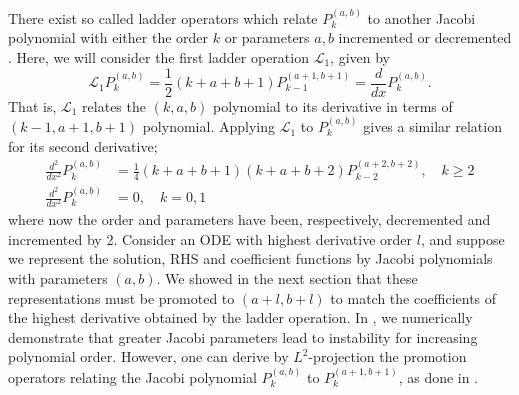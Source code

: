 There exist so called ladder operators which relate $P_k^{(a,b)}$ to another Jacobi polynomial with either the order $k$ or parameters $a,b$ incremented or decremented \cite{jacladder}. Here, we will consider the first ladder operation $\mathcal{L}_1$, given by
\begin{equation}\label{eq:ladder}
\mathcal{L}_1 P_k^{(a,b)} = \frac{1}{2}(k+a+b+1)P_{k-1}^{(a+1,b+1)} = \frac{d}{dx}P_k^{(a,b)}.
\end{equation}
That is, $\mathcal{L}_1$ relates the $(k,a,b)$ polynomial to its derivative in terms of $(k-1,a+1,b+1)$ polynomial. Applying $\mathcal{L}_1$ to $P_k^{(a,b)}$ gives a similar relation for its second derivative;
\begin{align}\label{eq:ladder2}
\frac{d^2}{dx^2}P_k^{(a,b)} &= \frac{1}{4}(k+a+b+1)(k+a+b+2)P_{k-2}^{(a+2,b+2)}, \quad k \geq 2 \\
\frac{d^2}{dx^2}P_k^{(a,b)} &= 0, \quad k = 0,1 \label{eq:ladder2_1}
\end{align}
where now the order and parameters have been, respectively, decremented and incremented by 2.
Consider an ODE with highest derivative order $l$, and suppose we represent the solution, RHS and coefficient functions by Jacobi polynomials with parameters $(a,b)$. We showed in the next section that these representations must be promoted to $(a+l,b+l)$ to match the coefficients of the highest derivative obtained by the ladder operation. In , we numerically demonstrate that greater Jacobi parameters lead to instability for increasing polynomial order. However, one can derive by $L^2$-projection the promotion operators relating the Jacobi polynomial $P_k^{(a,b)}$ to $P_k^{(a+1,b+1)}$, as done in \cite{promote}. 

